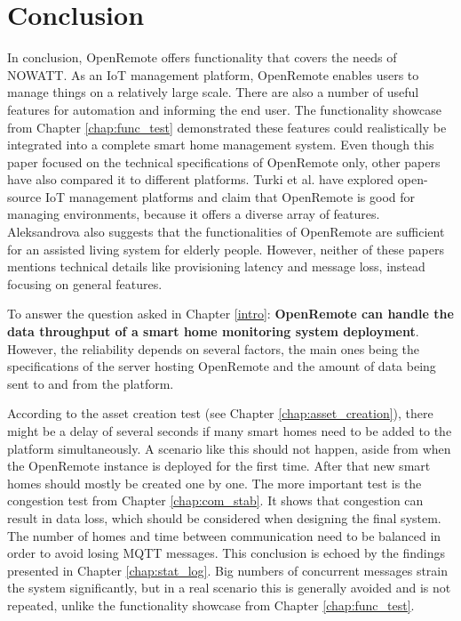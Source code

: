 \chapter{Conclusion}
In conclusion, OpenRemote offers functionality that covers the needs of NOWATT. As an IoT management platform, OpenRemote enables users to manage things on a relatively large scale. There are also a number of useful features for automation and informing the end user. The functionality showcase from Chapter \ref{chap:func_test} demonstrated these features could realistically be integrated into a complete smart home management system. Even though this paper focused on the technical specifications of OpenRemote only, other papers have also compared it to different platforms. Turki et al. \cite{turki2024evaluating} have explored open-source IoT management platforms and claim that OpenRemote is good for managing environments, because it offers a diverse array of features. Aleksandrova \cite{aleksandrova2022using} also suggests that the functionalities of OpenRemote are sufficient for an assisted living system for elderly people. However, neither of these papers mentions technical details like provisioning latency and message loss, instead focusing on general features.

To answer the question asked in Chapter \ref{intro}: \textbf{OpenRemote can handle the data throughput of a smart home monitoring system deployment}. However, the reliability depends on several factors, the main ones being the specifications of the server hosting OpenRemote and the amount of data being sent to and from the platform. 

According to the asset creation test (see Chapter \ref{chap:asset_creation}), there might be a delay of several seconds if many smart homes need to be added to the platform simultaneously. A scenario like this should not happen, aside from when the OpenRemote instance is deployed for the first time. After that new smart homes should mostly be created one by one. The more important test is the congestion test from Chapter \ref{chap:com_stab}. It shows that congestion can result in data loss, which should be considered when designing the final system. The number of homes and time between communication need to be balanced in order to avoid losing MQTT messages. This conclusion is echoed by the findings presented in Chapter \ref{chap:stat_log}. Big numbers of concurrent messages strain the system significantly, but in a real scenario this is generally avoided and is not repeated, unlike the functionality showcase from Chapter \ref{chap:func_test}.

